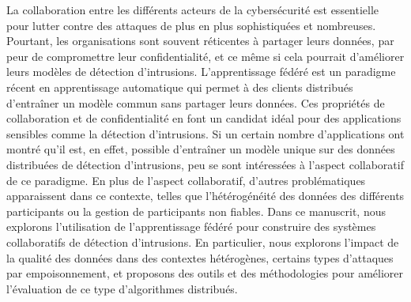 La collaboration entre les différents acteurs de la cybersécurité est essentielle pour lutter contre des attaques de plus en plus sophistiquées et nombreuses.
Pourtant, les organisations sont souvent réticentes à partager leurs données, par peur de compromettre leur confidentialité, et ce même si cela pourrait d'améliorer leurs modèles de détection d'intrusions.
L'apprentissage fédéré est un paradigme récent en apprentissage automatique qui permet à des clients distribués d'entraîner un modèle commun sans partager leurs données.
Ces propriétés de collaboration et de confidentialité en font un candidat idéal pour des applications sensibles comme la détection d'intrusions.
Si un certain nombre d'applications ont montré qu'il est, en effet, possible d'entraîner un modèle unique sur des données distribuées de détection d'intrusions, peu se sont intéressées à l'aspect collaboratif de ce paradigme.
En plus de l'aspect collaboratif, d'autres problématiques apparaissent dans ce contexte, telles que l'hétérogénéité des données des différents participants ou la gestion de participants non fiables.
%
Dans ce manuscrit, nous explorons l'utilisation de l'apprentissage fédéré pour construire des systèmes collaboratifs de détection d'intrusions.
En particulier, nous explorons l'impact de la qualité des données dans des contextes hétérogènes, certains types d'attaques par empoisonnement, et proposons des outils et des méthodologies pour améliorer l'évaluation de ce type d'algorithmes distribués.